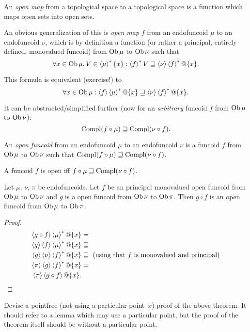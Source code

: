 \begin{defn}
An \emph{open map} from a topological space to a
topological space is a function which maps open sets into open sets.
\end{defn}
An obvious generalization of this is \emph{open map} $f$ from an
endofuncoid $\mu$ to an endofuncoid $\nu$, which is by definition
a function (or rather a principal, entirely defined, monovalued funcoid)
from $\operatorname{Ob}\mu$ to $\operatorname{Ob}\nu$ such that
\[
\forall x\in\operatorname{Ob}\mu,V\in\left\langle \mu\right\rangle ^{\ast}\{x\}:\left\langle f\right\rangle ^{\ast}V\sqsupseteq\left\langle \nu\right\rangle\left\langle f\right\rangle ^{\ast}@\{x\}.
\]


This formula is equivalent (exercise!) to
\[
\forall x\in\operatorname{Ob}\mu:\left\langle f\right\rangle\left\langle \mu\right\rangle ^{\ast}@\{x\}\sqsupseteq\left\langle \nu\right\rangle\left\langle f\right\rangle ^{\ast}@\{x\}.
\]


It can be abstracted/simplified further (now for an \emph{arbitrary}
funcoid $f$ from $\operatorname{Ob}\mu$ to $\operatorname{Ob}\nu$):
\[
\operatorname{Compl}(f\circ\mu)\sqsupseteq\operatorname{Compl}(\nu\circ f).
\]

\begin{defn}
An \emph{open funcoid} from an endofuncoid $\mu$
to an endofuncoid $\nu$ is a funcoid $f$ from $\operatorname{Ob}\mu$ to $\operatorname{Ob}\nu$
such that $\operatorname{Compl}(f\circ\mu)\sqsupseteq\operatorname{Compl}(\nu\circ f)$.\end{defn}
\begin{obvious}
A funcoid $f$ is open iff $f\circ\mu\sqsupseteq\operatorname{Compl}(\nu\circ f)$.\end{obvious}
\begin{thm}
Let $\mu$, $\nu$, $\pi$ be endofuncoids. Let $f$ be an
principal monovalued open funcoid from $\operatorname{Ob}\mu$ to $\operatorname{Ob}\nu$ and $g$ is a open funcoid
from $\operatorname{Ob}\nu$ to $\operatorname{Ob}\pi$. Then $g\circ f$ is an open funcoid from
$\operatorname{Ob}\mu$ to $\operatorname{Ob}\pi$.\end{thm}
\begin{proof}
\begin{align*}
\supfun{g\circ f}\rsupfun{\mu}@\{x\} & = \\
\supfun{g}\supfun{f}\rsupfun{\mu}@\{x\} & \sqsupseteq \\
\supfun{g}\supfun{\nu}\rsupfun{f}@\{x\} & \sqsupseteq \text{ (using that $f$ is monovalued and principal)}\\
\supfun{\pi}\supfun{g}\rsupfun{f}@\{x\} & = \\
\supfun{\pi}\supfun{g\circ f}@\{x\}.
\end{align*}
\end{proof}

\begin{problem}
Devise a pointfree (not using a particular point~$x$) proof of the above theorem.
It should refer to a lemma which may use a particular point, but the proof of the
theorem itself should be without a particular point.
\end{problem}